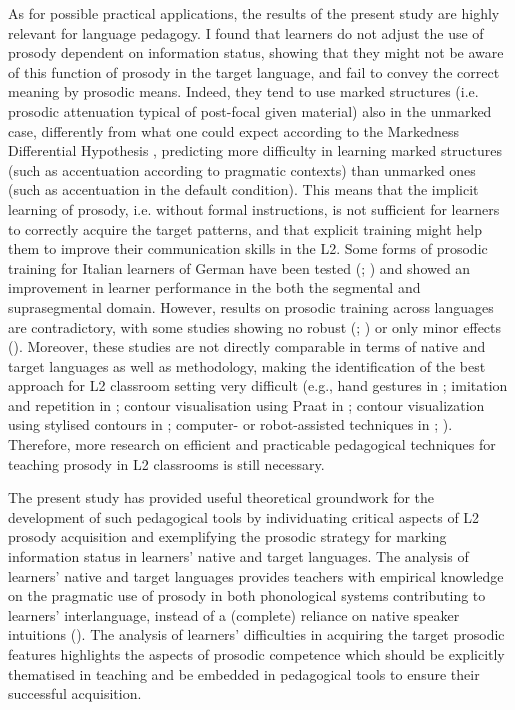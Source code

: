 As for possible practical applications, the results of the present study are highly relevant for language pedagogy. I found that learners do not adjust the use of prosody dependent on information status, showing that they might not be aware of this function of prosody in the target language, and fail to convey the correct meaning by prosodic means. Indeed, they tend to use marked structures (i.e. prosodic attenuation typical of post-focal given material) also in the unmarked case, differently from what one could expect according to the Markedness Differential Hypothesis \citep{Eckman1977}, predicting more difficulty in learning marked structures (such as accentuation according to pragmatic contexts) than unmarked ones (such as accentuation in the default condition). This means that the implicit learning of prosody, i.e. without formal instructions, is not sufficient for learners to correctly acquire the target patterns, and that explicit training might help them to improve their communication skills in the L2. Some forms of prosodic training for Italian learners of German have been tested (\citealt{Dahmen2013}; \citealt{Missaglia2007}) and showed an improvement in learner performance in the both the segmental and suprasegmental domain. However, results on prosodic training across languages are contradictory, with some studies showing no robust (\citealt{BaillsEtAl2022b}; \citealt{Suter1976}) or only minor effects (\citealt{PurcellSuter1980}). Moreover, these studies are not directly comparable in terms of native and target languages as well as methodology, making the identification of the best approach for L2 classroom setting very difficult (e.g., hand gestures in \citealt{BaillsEtAl2022b}; imitation and repetition in \citealt{NicoraEtAl2018}; contour visualisation using Praat in \citealt{Smorenburg2015}; contour visualization using stylised contours in \citealt{NiebuhrEtAl2017}; computer- or robot-assisted techniques in \citealt{Bissiri2008}; \citealt{NiebuhrAlm2021}). Therefore, more research on efficient and practicable pedagogical techniques for teaching prosody in L2 classrooms is still necessary.

The present study has provided useful theoretical groundwork for the development of such pedagogical tools by individuating critical aspects of L2 prosody acquisition and exemplifying the prosodic strategy for marking information status in learners’ native and target languages. The analysis of learners’ native and target languages provides teachers with empirical knowledge on the pragmatic use of prosody in both phonological systems contributing to learners’ interlanguage, instead of a (complete) reliance on native speaker intuitions (\citealt{DerwingMunro2015}). The analysis of learners’ difficulties in acquiring the target prosodic features highlights the aspects of prosodic competence which should be explicitly thematised in teaching and be embedded in pedagogical tools to ensure their successful acquisition.

